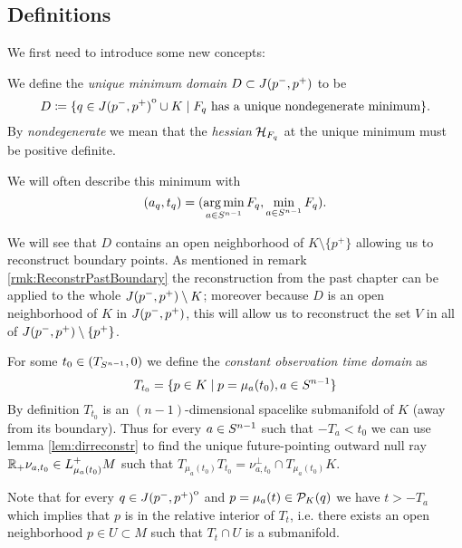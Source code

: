 \subsection{Definitions}
We first need to introduce some new concepts:
\begin{definition}\label{def:uniquemindomain}
    We define the \emph{unique minimum domain} $D\subset J(p^-,p^+)$ to be 
    \begin{equation}
        D\coloneqq \{q\in {\kern0ptJ(p^-,p^+)}^{\mathrm{o}} \cup K \mid F_q\text{ has a unique nondegenerate minimum}\}.
    \end{equation}
    By \emph{nondegenerate} we mean that the \emph{hessian} ${\mathcal{H}}_{F_q}$ at the unique minimum must be positive definite.

    We will often describe this minimum with 
    \[
        (a_q,t_q)=(\operatorname*{arg\,min}_{a\in {S^{n-1}}} F_q, \min_{a\in {S^{n-1}}} F_q).
    \]
\end{definition}
We will see that $D$ contains an open neighborhood of $K \setminus \{p^+\}$ allowing us to reconstruct boundary points. As mentioned in remark \ref{rmk:ReconstrPastBoundary} the reconstruction from the past chapter can be applied to the whole $J(p^-,p^+)\setminus K$; moreover because $D$ is an open neighborhood of $K$ in $J(p^-,p^+)$, this will allow us to reconstruct the set $V$ in all of $J(p^-,p^+)\setminus \{p^+\}$.

\begin{definition}\label{def:constobstime} For some $t_0\in (T_{S^{n-1}},0)$ we define the \emph{constant observation time domain} as 
\begin{equation}
    T_{t_0} = \{p\in K \mid p=\mu_a(t_0), a\in {S^{n-1}}\}
\end{equation} 
By definition $T_{t_0}$ is an $(n-1)$-dimensional spacelike submanifold of $K$ (away from its boundary).
Thus for every $a\in {S^{n-1}}$ such that $-T_a<t_0$ we can use lemma \ref{lem:dirreconstr} to find the unique future-pointing outward null ray $\mathbb{R}_+\nu_{a,t_0}\in L^+_{\mu_a(t_0)}M$ such that $T_{\mu_a(t_0)}T_{t_0} = \nu_{a,t_0}^\perp \cap T_{\mu_a(t_0)}K$.

Note that for every $q\in {\kern0ptJ(p^-,p^+)}^{\mathrm{o}}$ and $p=\mu_a(t)\in {\mathcal{P}}_K(q)$ we have $t>-T_a$ which implies that $p$ is in the relative interior of $T_{t}$, i.e. there exists an open neighborhood $p\in U \subset M$ such that $T_t\cap U$ is a submanifold.
\end{definition}

